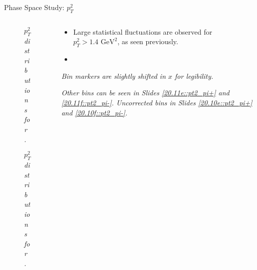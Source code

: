\begin{frame}{Phase Space Study: $p_T^2$}
    \label{12.15::pt2}

    \begin{columns}[onlytextwidth,T]

    \begin{column}{.44\linewidth}
        \vspace{-15pt}
        \begin{center}
            \begin{figure}[t]
                \scriptsize{\textit{$p_T^2$ distributions for \ef{$\pi^-$}.}}
            \end{figure}

            \vspace{-9pt}
            \begin{figure}[t]
                \scriptsize{\textit{$p_T^2$ distributions for \ef{$\pi^+$}.}}
            \end{figure}
        \end{center}
    \end{column}

    \begin{column}{.54\linewidth}
        \begin{itemize}
            \item
                Large statistical fluctuations are observed for $p_T^2 > 1.4 \text{ GeV}^2$, as seen previously.

            \vspace{12pt}
            \item
        \end{itemize}

        \vspace{105pt}

        \begin{flushright}
            \tiny{\textit{Bin markers are slightly shifted in $x$ for legibility.}}

            \vspace{-0.5pt}

            \tiny{\textit{
                Other bins can be seen in Slides \textcolor{efd_purple}{\ref{20.11e::pt2_pi+}} and \textcolor{efd_purple}{\ref{20.11f::pt2_pi-}}.
                Uncorrected bins in Slides \textcolor{efd_purple}{\ref{20.10e::pt2_pi+}} and \textcolor{efd_purple}{\ref{20.10f::pt2_pi-}}.
            }}
        \end{flushright}
    \end{column}

    \end{columns}
\end{frame}

